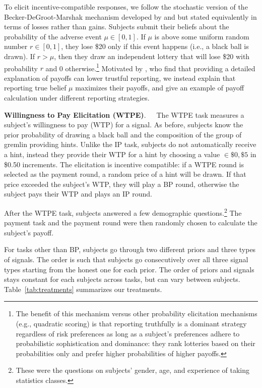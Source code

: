 \documentclass[12pt,a4paper]{article}
\begin{document}
To elicit incentive-compatible responses, we follow the stochastic version of the Becker-DeGroot-Marshak mechanism developed by \citet{grether_testing_1992} and \citet{holt_update_2009} but stated equivalently in terms of losses rather than gains.
Subjects submit their beliefs about the probability of the adverse event $\mu \in [0,1]$. If $\mu$ is above some uniform random number $r\in[0,1]$, they lose \$20 only if this event happens (i.e., a black ball is drawn). If $r > \mu$, then they draw an independent lottery that will lose \$20 with probability $r$ and 0 otherwise.\footnote{The benefit of this mechanism versus other probability elicitation mechanisms (e.g., quadratic scoring) is that reporting truthfully is a dominant strategy regardless of risk preferences \citep{karni_mechanism_2009-1} as long as a subject's preferences adhere to probabilistic sophistication and dominance: they rank lotteries based on their probabilities only and prefer higher probabilities of higher payoffs.} Motivated by \citet{danz_belief_2020}, who find that providing a detailed explanation of payoffs can lower trustful reporting, we instead explain that reporting true belief $\mu$ maximizes their payoffs, and give an example of payoff calculation under different reporting strategies.

\bigskip
\noindent\textbf{Willingness to Pay Elicitation (WTPE)}.\ \ \ The WTPE task measures a subject's willingness to pay (WTP) for a signal. As before, subjects know the prior probability of drawing a black ball and the composition of the group of gremlin providing hints.  Unlike the IP task, subjects do not automatically receive a hint, instead they provide their WTP for a hint by choosing a value $\in{\$0,\$5}$ in \$0.50 increments. The elicitation is incentive compatible: if a WTPE round is selected as the payment round, a random price of a hint will be drawn. If that price exceeded the subject's WTP, they will play a BP round, otherwise the subject pays their WTP and plays an IP round.  

\vspace{10pt} 

After the WTPE task, subjects answered a few demographic questions.\footnote{These were the questions on subjects' gender, age, and experience of taking statistics classes.} The payment task and the payment round were then randomly chosen to calculate the subject's payoff. 

For tasks other than BP, subjects go through two different priors and three types of signals. The order is such that subjects go consecutively over all three signal types starting from the honest one for each prior. The order of priors and signals stays constant for each subjects across tasks, but can vary between subjects. Table~\ref{tab:treatments} summarizes our treatments.
\end{document}
